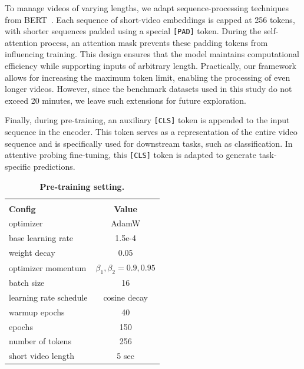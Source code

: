 To manage videos of varying lengths, we adapt sequence-processing techniques from BERT~\cite{devlin2019bert}. Each sequence of short-video embeddings is capped at 256 tokens, with shorter sequences padded using a special \texttt{[PAD]} token. During the self-attention process, an attention mask prevents these padding tokens from influencing training. This design ensures that the model maintains computational efficiency while supporting inputs of arbitrary length. Practically, our framework allows for increasing the maximum token limit, enabling the processing of even longer videos. However, since the benchmark datasets used in this study do not exceed 20 minutes, we leave such extensions for future exploration.

Finally, during pre-training, an auxiliary \texttt{[CLS]} token is appended to the input sequence in the encoder. This token serves as a representation of the entire video sequence and is specifically used for downstream tasks, such as classification. In attentive probing fine-tuning, this \texttt{[CLS]} token is adapted to generate task-specific predictions.


\begin{table}[t]
    \caption{\textbf{Pre-training setting.}}
    \vspace{-1.5em}
    \begin{center}
    \small
        \begin{tabular}{l|c}
            \hline
            
            \hline
            
            \hline\\[-3mm]
            \textbf{Config} & \textbf{Value } \\
            \hline
            optimizer & AdamW \\
            base learning rate & 1.5e-4 \\
            weight decay & 0.05 \\
            optimizer momentum & $\beta_1, \beta_2{=}0.9, 0.95$ \\
            batch size & 16 \\
            learning rate schedule & cosine decay \\
            warmup epochs & 40 \\
            epochs  & 150 \\
            number of tokens & 256 \\ 
            short video length & 5 sec \\ 
            \hline 
            
            \hline
            
            \hline
        \end{tabular}

    \end{center}
\vspace{-1.2em}
\label{tab:hyperparams_pretrain}
\vspace{1.5em}
\end{table}


